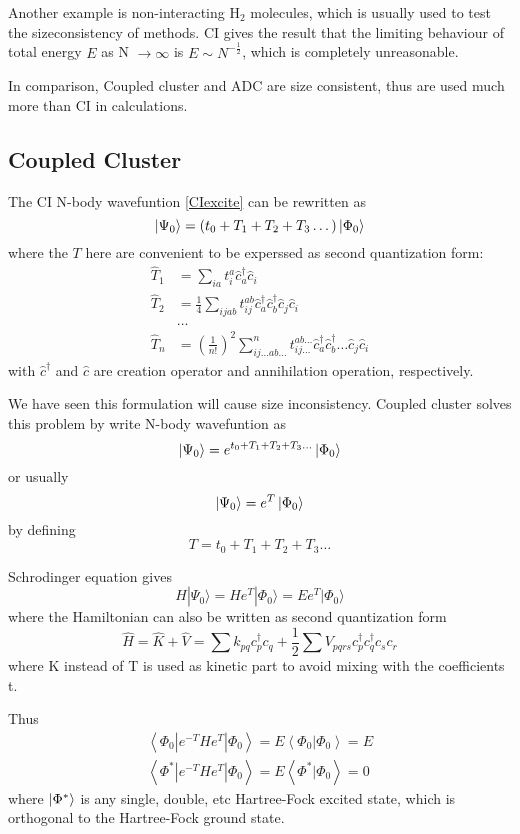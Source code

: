 Another example is non-interacting $\text{H}_2$ molecules, which is usually used to test the sizeconsistency of methods. \cite{h2problem}
CI gives the result that the limiting behaviour of total energy $E$ as N $\rightarrow \infty$ is $E \sim N^{-\frac{1}{2}}$, which is completely unreasonable.

In comparison, Coupled cluster and ADC are size consistent, thus are used much more than CI in calculations.

\subsection{Coupled Cluster}
The CI N-body wavefuntion \ref{CIexcite} can be rewritten as 
$$
\ket{\Psi_0}=(t_0+T_1+T_2+T_3 \dots)\ket{\Phi_0}
$$
where the $T$ here are convenient to be experssed as second quantization form:
\begin{align*}
	\hat{T}_{1} &=\sum_{i a} t_{i}^{a} \hat{c}_{a}^{\dagger} \hat{c}_{i}
	\\
	\hat{T}_{2} &=\frac{1}{4} \sum_{i j a b} t_{i j}^{a b} \hat{c}_{a}^{\dagger} \hat{c}_{b}^{\dagger} \hat{c}_{j} \hat{c}_{i}
	\\
	&\dots
	\\
	\hat{T}_{n}&=\left(\frac{1}{n !}\right)^{2} \sum_{i j \ldots a b \ldots}^{n} t_{i j \ldots}^{a b \ldots} \hat{c}_{a}^{\dagger} \hat{c}_{b}^{\dagger} \ldots \hat{c}_{j} \hat{c}_{i}
\end{align*}
with $\hat{c}^{\dagger}$ and $\hat{c}$ are creation operator and annihilation operation, respectively.

We have seen this formulation will cause size inconsistency.
Coupled cluster solves this problem by write N-body wavefuntion as
$$
\ket{\Psi_0}=e^{t_0+T_1+T_2+T_3 \dots}\ket{\Phi_0}
$$
or usually
$$
\ket{\Psi_0}=e^{T}\ket{\Phi_0}
$$
by defining
$$
T=t_0+T_1+T_2+T_3 \dots
$$

Schrodinger equation gives
$$
H | \Psi_{0} \rangle=H e^{T} | \Phi_{0} \rangle=E e^{T} | \Phi_{0} \rangle
$$
where the Hamiltonian can also be written as second quantization form
$$
\hat{H}=\hat{K}+\hat{V}=\sum k_{p q} c_{p}^{\dagger} c_{q}+\frac{1}{2} \sum V_{p q r s} c_{p}^{\dagger} c_{q}^{\dagger} c_{s} c_{r}
$$
where K instead of T is used as kinetic part to avoid mixing with the coefficients t.

Thus
$$
\begin{array}{l}
{\left\langle\Phi_{0}\left|e^{-T} H e^{T}\right| \Phi_{0}\right\rangle= E\left\langle\Phi_{0} | \Phi_{0}\right\rangle= E}
\\
{\left\langle\Phi^{*}\left|e^{-T} H e^{T}\right| \Phi_{0}\right\rangle= E\left\langle\Phi^{*} | \Phi_{0}\right\rangle= 0}
\end{array}
$$
where $\ket{\Phi^{*}}$ is any single, double, etc Hartree-Fock excited state, which is orthogonal to the Hartree-Fock ground state.

